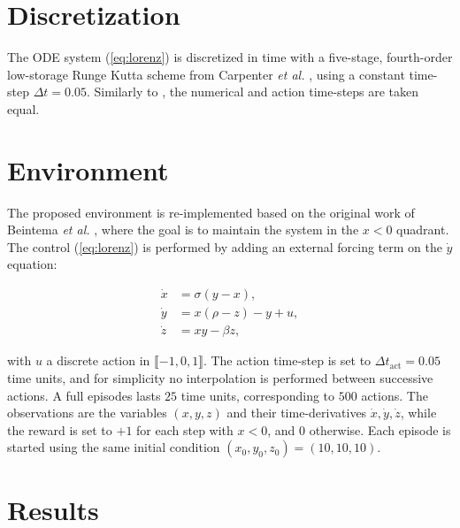 \section{Discretization}

The ODE system (\ref{eq:lorenz}) is discretized in time with a five-stage, fourth-order low-storage Runge Kutta scheme from Carpenter \textit{et al.} \cite{carpenter1994}, using a constant time-step $\Delta t=0.05$. Similarly to \cite{beintema2020}, the numerical and action time-steps are taken equal.

\section{Environment}

The proposed environment is re-implemented based on the original work of Beintema \textit{et al.} \cite{beintema2020}, where the goal is to maintain the system in the $x<0$ quadrant. The control (\ref{eq:lorenz}) is performed by adding an external forcing term on the $\dot{y}$ equation:

\begin{equation}
\label{eq:lorenz}
\begin{split}
	\dot{x} 	&= \sigma (y - x), \\
	\dot{y}	&= x(\rho - z) - y + u, \\
	\dot{z}	&= xy - \beta z,
\end{split}
\end{equation}

with $u$ a discrete action in $\llbracket -1, 0, 1 \rrbracket$. The action time-step is set to $\Delta t_\text{act} = 0.05$ time units, and for simplicity no interpolation is performed between successive actions. A full episodes lasts $25$ time units, corresponding to $500$ actions. The observations are the variables $(x, y, z)$ and their time-derivatives $\dot{x}, \dot{y}, \dot{z}$, while the reward is set to $+1$ for each step with $x<0$, and $0$ otherwise. Each episode is started using the same initial condition $(x_0, y_0, z_0) = (10,10,10)$.

\section{Results}

